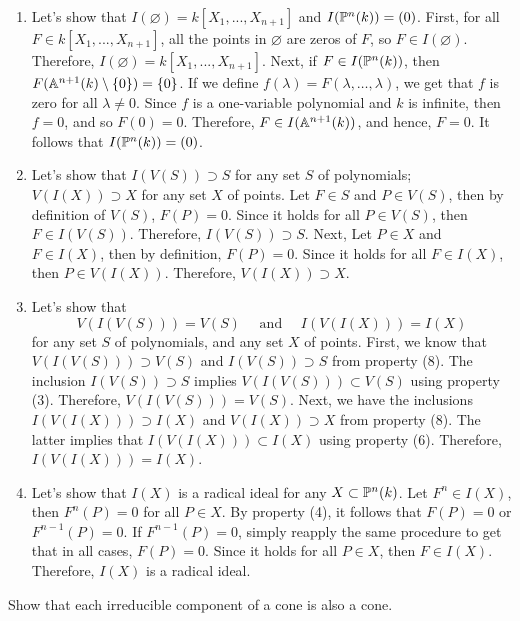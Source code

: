 \begin{solution}
\begin{enumerate}[label = (\arabic*)]
        \item Let's show that $I(\varnothing) = k[X_1, ..., X_{n+1}]$ and $I(\P^n(k)) = (0)$. First, for all $F \in k[X_1, ..., X_{n+1}]$, all the points in $\varnothing$ are zeros of $F$, so $F \in I(\varnothing)$. Therefore, $I(\varnothing) = k[X_1, ..., X_{n+1}]$. Next, if $F \in I(\P^n(k))$, then $F(\A^{n+1}(k)\setminus \{0\}) = \{0\}$. If we define $f(\lambda) = F(\lambda, \dots, \lambda)$, we get that $f$ is zero for all $\lambda \neq 0$. Since $f$ is a one-variable polynomial and $k$ is infinite, then $f = 0$, and so $F(0) = 0$. Therefore, $F \in I(\A^{n+1}(k))$, and hence, $F = 0$. It follows that $I(\P^n(k)) = (0)$.
        \item Let's show that $I(V(S)) \supset S$ for any set $S$ of polynomials; $V(I(X)) \supset X$ for any set $X$ of points. Let $F \in S$ and $P \in V(S)$, then by definition of $V(S)$, $F(P) = 0$. Since it holds for all $P \in V(S)$, then $F \in I(V(S))$. Therefore, $I(V(S)) \supset S$. Next, Let $P \in X$ and $F \in I(X)$, then by definition, $F(P) = 0$. Since it holds for all $F \in I(X)$, then $P \in V(I(X))$. Therefore, $V(I(X)) \supset X$.
        \item Let's show that
        $$V(I(V(S))) = V(S) \quad \text{ and } \quad I(V(I(X))) = I(X)$$
        for any set $S$ of polynomials, and any set $X$ of points. First, we know that $V(I(V(S))) \supset V(S)$ and $I(V(S)) \supset S$ from property (8). The inclusion $I(V(S)) \supset S$ implies $V(I(V(S))) \subset V(S)$ using property (3). Therefore, $V(I(V(S))) = V(S)$. Next, we have the inclusions $I(V(I(X))) \supset I(X)$ and $V(I(X)) \supset X$ from property (8). The latter implies that $I(V(I(X))) \subset I(X)$ using property (6). Therefore, $I(V(I(X))) = I(X)$.
        \item Let's show that $I(X)$ is a radical ideal for any $X \subset \P^n(k)$. Let $F^n \in I(X)$, then $F^n(P) = 0$ for all $P \in X$. By property (4), it follows that $F(P) = 0$ or $F^{n-1}(P) = 0$. If $F^{n-1}(P) = 0$, simply reapply the same procedure to get that in all cases, $F(P) = 0$. Since it holds for all $P \in X$, then $F \in I(X)$. Therefore, $I(X)$ is a radical ideal. \\
    \end{enumerate}
\end{solution}

\begin{exercise}
    Show that each irreducible component of a cone is also a cone. \\
\end{exercise}

